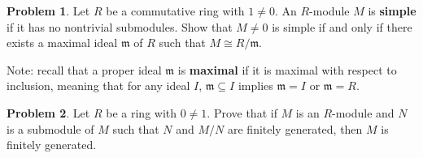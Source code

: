 \documentclass[11pt]{article}
\newcommand{\m}{\mathfrak{m}}
\theoremstyle{definition}
\newtheorem{problem}{Problem}
\begin{document}
\begin{problem}
Let $R$ be a commutative ring with $1 \neq 0$. An $R$-module $M$ is {\bf simple} if it has no nontrivial submodules.
Show that $M \neq 0$ is simple if and only if there exists a maximal ideal $\m$ of $R$ such that $M \cong R/\m$.

\noindent
Note: recall that a proper ideal $\m$ is {\bf maximal} if it is maximal with respect to inclusion, meaning that for any ideal $I$, $\m \subseteq I$ implies $\m = I$ or $\m = R$.
\end{problem}






\begin{problem}
	Let $R$ be a ring with $0\neq 1$. Prove that if $M$ is an $R$-module and $N$ is a submodule of $M$ such that $N$ and $M/N$ are finitely generated, then $M$ is finitely generated.
\end{problem}
\end{document}
